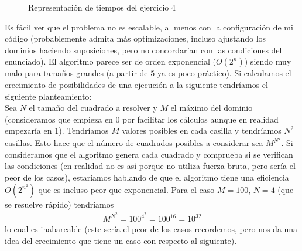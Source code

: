 \documentclass[11pt]{article}
\begin{document}
\begin{figure}[H]
    \centering
    \caption{Representación de tiempos del ejercicio 4}
    \label{fig:eficiencia_4}
\end{figure}

Es fácil ver que el problema no es escalable, al menos con la configuración de mi código (probablemente admita más optimizaciones, incluso ajustando los dominios haciendo suposiciones, pero no concordarían con las condiciones del enunciado). El algoritmo parece ser de orden exponencial ($O(2^n)$) siendo muy malo para tamaños grandes (a partir de $5$ ya es poco práctico). Si calculamos el crecimiento de posibilidades de una ejecución a la siguiente tendríamos el siguiente planteamiento:\\

Sea $N$ el tamaño del cuadrado a resolver y $M$ el máximo del dominio (consideramos que empieza en 0 por facilitar los cálculos aunque en realidad empezaría en 1). Tendríamos $M$ valores posibles en cada casilla y tendríamos $N^2$ casillas. Esto hace que el número de cuadrados posibles a considerar sea $M^{N^2}$. Si consideramos que el algoritmo genera cada cuadrado y comprueba si se verifican las condiciones (en realidad no es así porque no utiliza fuerza bruta, pero sería el peor de los casos), estaríamos hablando de que el algoritmo tiene una eficiencia $O(2^{n^2})$ que es incluso peor que exponencial. Para el caso $M=100$, $N=4$ (que se resuelve rápido) tendríamos 
\begin{gather*}
    M^{N^2} = 100^{4^2} = 100^16 = 10^{32}
\end{gather*}
lo cual es inabarcable (este sería el peor de los casos recordemos, pero nos da una idea del crecimiento que tiene un caso con respecto al siguiente).
\end{document}
